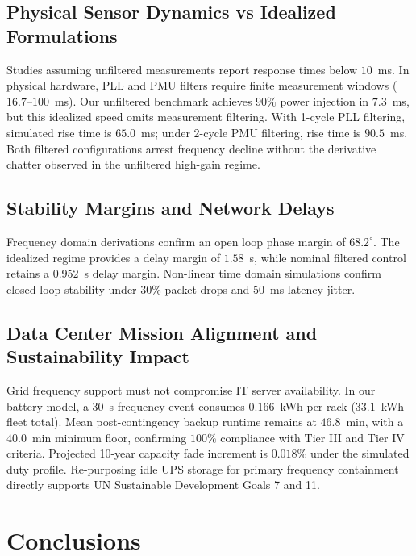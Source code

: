 \documentclass[preprint,12pt]{elsarticle}
\begin{document}
\subsection{Physical Sensor Dynamics vs Idealized Formulations}
\label{sec:disc_sensing}
Studies assuming unfiltered measurements report response times below $10$~ms. In physical hardware, PLL and PMU filters require finite measurement windows ($16.7$--$100$~ms). Our unfiltered benchmark achieves $90\%$ power injection in $7.3$~ms, but this idealized speed omits measurement filtering. With 1-cycle PLL filtering, simulated rise time is $65.0$~ms; under 2-cycle PMU filtering, rise time is $90.5$~ms. Both filtered configurations arrest frequency decline without the derivative chatter observed in the unfiltered high-gain regime.

\subsection{Stability Margins and Network Delays}
\label{sec:disc_stability}
Frequency domain derivations confirm an open loop phase margin of $68.2^\circ$. The idealized regime provides a delay margin of $1.58$~s, while nominal filtered control retains a $0.952$~s delay margin. Non-linear time domain simulations confirm closed loop stability under $30\%$ packet drops and $50$~ms latency jitter.

\subsection{Data Center Mission Alignment and Sustainability Impact}
\label{sec:disc_mission}
Grid frequency support must not compromise IT server availability. In our battery model, a 30~s frequency event consumes $0.166$~kWh per rack ($33.1$~kWh fleet total). Mean post-contingency backup runtime remains at $46.8$~min, with a $40.0$~min minimum floor, confirming $100\%$ compliance with Tier III and Tier IV criteria. Projected 10-year capacity fade increment is $0.018\%$ under the simulated duty profile. Re-purposing idle UPS storage for primary frequency containment directly supports UN Sustainable Development Goals 7 and 11.

\section{Conclusions}
\label{sec:conclusions}
\end{document}
